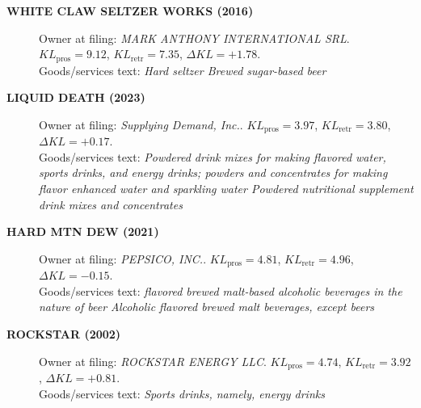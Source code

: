 \begin{description}
\item[\textbf{WHITE CLAW SELTZER WORKS (2016)}] Owner at filing: \emph{MARK ANTHONY INTERNATIONAL SRL}. $KL_{\text{pros}}=9.12$, $KL_{\text{retr}}=7.35$, $\Delta KL=+1.78$.\\
Goods/services text: \emph{Hard seltzer Brewed sugar-based beer}\\

\item[\textbf{LIQUID DEATH (2023)}] Owner at filing: \emph{Supplying Demand, Inc.}. $KL_{\text{pros}}=3.97$, $KL_{\text{retr}}=3.80$, $\Delta KL=+0.17$.\\
Goods/services text: \emph{Powdered drink mixes for making flavored water, sports drinks, and energy drinks; powders and concentrates for making flavor enhanced water and sparkling water Powdered nutritional supplement drink mixes and concentrates}\\

\item[\textbf{HARD MTN DEW (2021)}] Owner at filing: \emph{PEPSICO, INC.}. $KL_{\text{pros}}=4.81$, $KL_{\text{retr}}=4.96$, $\Delta KL=-0.15$.\\
Goods/services text: \emph{flavored brewed malt-based alcoholic beverages in the nature of beer Alcoholic flavored brewed malt beverages, except beers}\\

\item[\textbf{ROCKSTAR (2002)}] Owner at filing: \emph{ROCKSTAR ENERGY LLC}. $KL_{\text{pros}}=4.74$, $KL_{\text{retr}}=3.92$, $\Delta KL=+0.81$.\\
Goods/services text: \emph{Sports drinks, namely, energy drinks}\\

\end{description}
